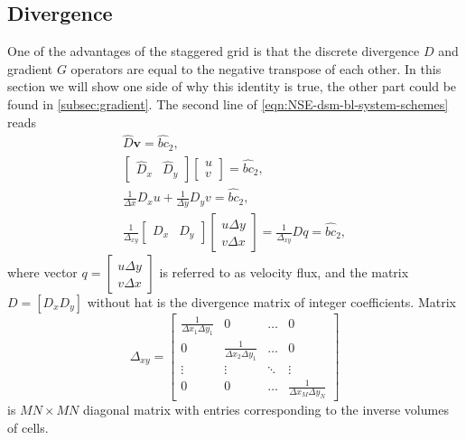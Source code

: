 \documentclass{article}
\numberwithin{equation}{section}
\begin{document}
\subsection{Divergence}\label{subsec:divergence}

One of the advantages of the staggered grid is that the discrete divergence $D$ and gradient $G$ operators are equal to the negative transpose of each other. 
In this section we will show one side of why this identity is true, the other part could be found in \cref{subsec:gradient}.
The second line of \cref{eqn:NSE-dsm-bl-system-schemes} reads
\begin{equation*}
\begin{gathered}
\hat{D}\boldsymbol{v}=\hat{bc}_2,\\
\left[ 
\begin{array}{ll}
\hat{D}_x & \hat{D}_y 	
\end{array}
\right]\left[\begin{array}{l}
u\\
v
\end{array}
\right]=\hat{bc}_2
, \\
\frac{1}{\Delta x} D_x u+\frac{1}{\Delta y} D_y v=\hat{bc}_2, \\
\frac{1}{\Delta _{xy}}\left[\begin{array}{ll}
D_x & D_y
\end{array}\right]\left[\begin{array}{l}
u \Delta y \\
v \Delta x
\end{array}\right]=\frac{1}{\Delta _{xy}} D q=\hat{bc}_2,
\end{gathered}
\end{equation*}
where vector $q=\left[\begin{array}{l}
u \Delta y \\
v \Delta x
\end{array}\right]$ is referred to as velocity flux, and the matrix $D=[D_x D_y]$ without hat is the divergence matrix of integer coefficients. Matrix
\begin{equation}\label{eqn:delta-xy}
	\Delta _{xy}=
	\begin{bmatrix}{}
		\frac{1}{\Delta x_1\Delta y_1}		&0	&\dots	&0\\
		0		&\frac{1}{\Delta x_2\Delta y_1}	&\dots	&0\\
		\vdots		&\vdots	&\ddots	&\vdots\\
		0		&0	&\dots	&\frac{1}{\Delta x_M\Delta y_N}
	\end{bmatrix}
\end{equation}
is $MN\times MN$ diagonal matrix with entries corresponding to the inverse volumes of cells. 
\end{document}
